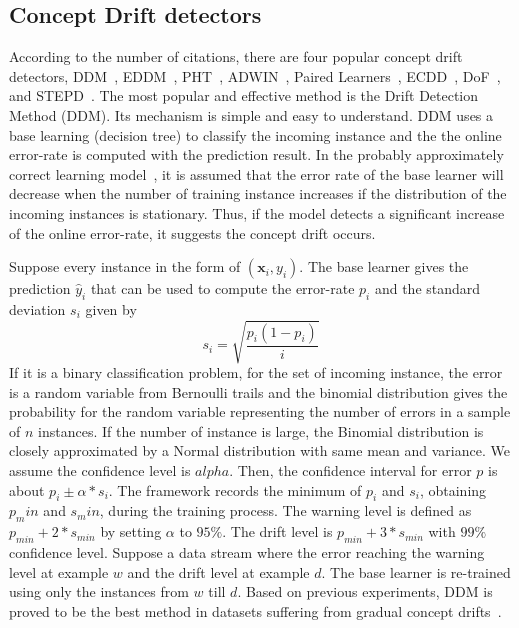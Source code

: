 \subsection{Concept Drift detectors}
According to the number of citations, there are four popular concept drift detectors, DDM~\cite{gama2004learning}, EDDM~\cite{baena2006ear}, PHT~\cite{page1954continuous}, ADWIN~\cite{bifet2007learning}, Paired Learners~\cite{bach2008paired}, ECDD~\cite{ross2012exponentially}, DoF~\cite{sobhani2011new}, and STEPD~\cite{nishida2007detecting}. The most popular and effective method is the Drift Detection Method (DDM). Its mechanism is simple and easy to understand. DDM uses a base learning (decision tree) to classify the incoming instance and the the online error-rate is computed with the prediction result. In the probably approximately correct learning model~\cite{michalski2013machine}, it is assumed that the error rate of the base learner will decrease when the number of training instance increases if the distribution of the incoming instances is stationary. Thus, if the model detects a significant increase of the online error-rate, it suggests the concept drift occurs. 

Suppose every instance in the form of $(\mathbf{x}_i, y_i)$. The base learner gives the prediction $\hat{y}_i$ that can be used to compute the error-rate $p_i$ and the standard deviation $s_i$ given by 
\begin{equation}
s_i = \sqrt{\frac{p_i(1-p_i)}{i}}
\end{equation}
If it is a binary classification problem, for the set of incoming instance, the error is a random variable from Bernoulli trails and the binomial distribution gives the probability for the random variable representing the number of errors in a sample of $n$ instances. If the number of instance is large, the Binomial distribution is closely approximated by a Normal distribution with same mean and variance. We assume the confidence level is $alpha$. Then, the confidence interval for error $p$ is about $p_i\pm\alpha*s_i$. The framework records the minimum of $p_i$ and $s_i$, obtaining $p_min$ and $s_min$, during the training process. The warning level is defined as $p_{min} + 2 * s_{min}$ by setting $\alpha$ to $95\%$. The drift level is $p_{min} + 3 * s_{min}$ with $99\%$ confidence level. Suppose a data stream where the error reaching the warning level at example $w$ and the drift level at example $d$. The base learner is re-trained using only the instances from $w$ till $d$. Based on previous experiments, DDM is proved to be the best method in datasets suffering from gradual concept drifts~\cite{Goncalves2014}.

